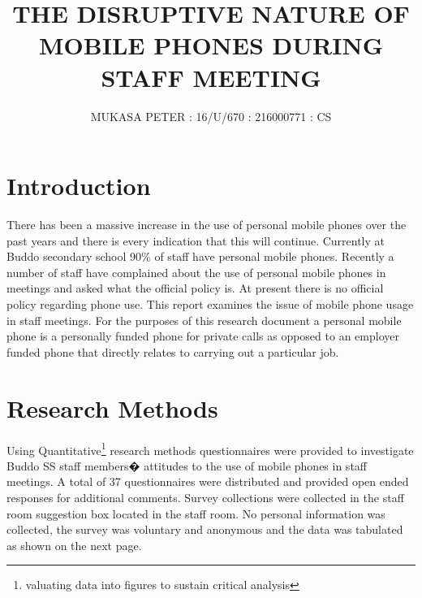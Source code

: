 \documentclass[11pt]{article}
\title{\textbf{THE DISRUPTIVE NATURE OF MOBILE PHONES DURING STAFF MEETING}}
\author{MUKASA PETER : 16/U/670 : 216000771 : CS}
\date{}
\begin{document}
\maketitle

\section{Introduction}
 There has been a massive increase in the use of personal mobile phones over the past years and there is every indication that this will continue. Currently at Buddo secondary school 90\% of staff have personal mobile phones. Recently a number of staff have complained about the use of personal mobile phones in meetings and asked what the official policy is. At present there is no official policy regarding phone use. This report examines the issue of mobile phone usage in staff meetings. For the purposes of this research document a personal mobile phone is a personally funded phone for private calls as opposed to an employer funded phone that directly relates to carrying out a particular job.

\section{Research Methods}
Using Quantitative\footnote{valuating data into figures to sustain critical analysis} research methods questionnaires were provided to investigate Buddo SS staff members� attitudes to the use of mobile phones in staff meetings. A total of 37 questionnaires were distributed and provided open ended responses for additional comments. Survey collections were collected in the staff room suggestion box located in the staff room. No personal information was collected, the survey was voluntary and anonymous and the data was tabulated as shown on the next page. 
\end{document}
